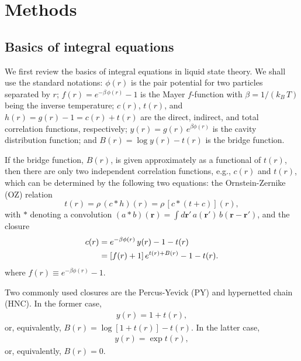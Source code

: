 \documentclass[aip,jcp,reprint,superscriptaddress]{revtex4-1}
\newcommand{\vct}[1]{\mathbf{#1}}
\providecommand{\vr}{} %
\renewcommand{\vr}{\vct{r}}
\begin{document}
\section{Methods}





\subsection{Basics of integral equations}



We first review the basics of integral equations
in liquid state theory.
%
We shall use the standard notations:
%
$\phi(r)$
is the pair potential
for two particles separated by $r$;
%
$f(r) = e^{ -\beta \, \phi(r) } - 1$
is the Mayer $f$-function
with
$\beta = 1/(k_B \, T)$
being the inverse temperature;
%
$c(r)$, $t(r)$, and $h(r) = g(r) - 1 = c(r) + t(r)$
are the direct, indirect,
and total correlation functions, respectively;
%
$y(r) = g(r) \, e^{\beta \phi(r)}$
is the cavity distribution function;
%
and
$B(r) = \log y(r) - t(r)$
is the bridge function.



If the bridge function, $B(r)$, is given
approximately as a functional of $t(r)$,
then there are only two independent correlation functions,
e.g., $c(r)$ and $t(r)$, which can be determined
by the following two equations:
%
the Ornstein-Zernike (OZ) relation
\begin{equation}
  t(r) = \rho \, (c * h)(r)
       = \rho \, [c * (t + c)] (r),
  \label{eq:oz}
\end{equation}
%
with $*$ denoting a convolution
$(a * b)(\vr) = \int d\vr' \, a(\vr') \, b(\vr - \vr')$,
%
and the closure
%
\begin{align}
  c(r)
  &= e^{-\beta \phi(r)} \, y(r) - 1 - t(r) \notag \\
  &= [f(r) + 1] \, e^{t(r) + B(r)} - 1 - t(r).
  \label{eq:closure}
\end{align}
%
where $f(r) \equiv e^{-\beta \phi(r)} - 1$.



Two commonly used closures are
the Percus-Yevick (PY)
and hypernetted chain (HNC).
%
In the former case,
%
\begin{align}
y(r) = 1 + t(r),
\label{eq:PY}
\end{align}
%
or, equivalently,
$B(r) = \log[1 + t(r)] - t(r)$.
%
In the latter case,
%
\begin{align}
y(r) = \exp t(r),
\label{eq:HNC}
\end{align}
%
or, equivalently,
$B(r) = 0$.
\end{document}
